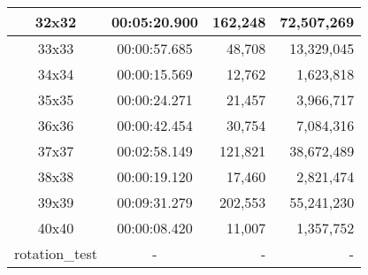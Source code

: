 \begin{center}
\begin{tabular}{|c|c|r|r|}
		32x32 & 00:05:20.900 & 162,248 & 72,507,269 \\ \hline
		33x33 & 00:00:57.685 & 48,708 & 13,329,045 \\ \hline
		34x34 & 00:00:15.569 & 12,762 & 1,623,818 \\ \hline
		35x35 & 00:00:24.271 & 21,457 & 3,966,717 \\ \hline
		36x36 & 00:00:42.454 & 30,754 & 7,084,316 \\ \hline
		37x37 & 00:02:58.149 & 121,821 & 38,672,489 \\ \hline
		38x38 & 00:00:19.120 & 17,460 & 2,821,474 \\ \hline
		39x39 & 00:09:31.279 & 202,553 & 55,241,230 \\ \hline
		40x40 & 00:00:08.420 & 11,007 & 1,357,752 \\ \hline
		rotation\_test & - & - & - \\ \hline

    \end{tabular}
\end{center}
